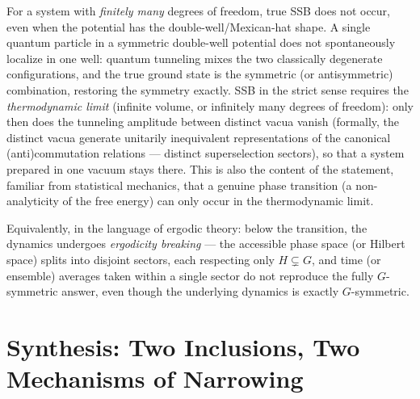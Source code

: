\documentclass[11pt]{article}
\theoremstyle{definition}
\theoremstyle{remark}
\begin{document}
For a system with \emph{finitely many} degrees of freedom, true SSB does not occur, even when the potential has the double-well/Mexican-hat shape. A single quantum particle in a symmetric double-well potential does not spontaneously localize in one well: quantum tunneling mixes the two classically degenerate configurations, and the true ground state is the symmetric (or antisymmetric) combination, restoring the symmetry exactly. SSB in the strict sense requires the \emph{thermodynamic limit} (infinite volume, or infinitely many degrees of freedom): only then does the tunneling amplitude between distinct vacua vanish (formally, the distinct vacua generate unitarily inequivalent representations of the canonical (anti)commutation relations — distinct superselection sectors), so that a system prepared in one vacuum stays there. This is also the content of the statement, familiar from statistical mechanics, that a genuine phase transition (a non-analyticity of the free energy) can only occur in the thermodynamic limit.

Equivalently, in the language of ergodic theory: below the transition, the dynamics undergoes \emph{ergodicity breaking} — the accessible phase space (or Hilbert space) splits into disjoint sectors, each respecting only $H\subsetneq G$, and time (or ensemble) averages taken within a single sector do not reproduce the fully $G$-symmetric answer, even though the underlying dynamics is exactly $G$-symmetric.

\section{Synthesis: Two Inclusions, Two Mechanisms of Narrowing}
\label{sec:synthesis}
\end{document}
